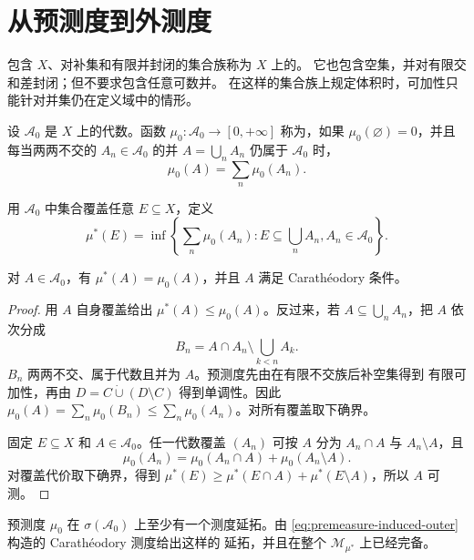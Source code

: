 \section{从预测度到外测度}

包含 $X$、对补集和有限并封闭的集合族称为 $X$ 上的。
它也包含空集，并对有限交和差封闭；但不要求包含任意可数并。
在这样的集合族上规定体积时，可加性只能针对并集仍在定义域中的情形。

\begin{definition}
设 $\mathcal A_0$ 是 $X$ 上的代数。函数
$\mu_0:\mathcal A_0\to[0,+\infty]$ 称为，如果
$\mu_0(\varnothing)=0$，并且每当两两不交的 $A_n\in\mathcal A_0$ 的并
$A=\bigcup_nA_n$ 仍属于 $\mathcal A_0$ 时，
\[
 \mu_0(A)=\sum_n\mu_0(A_n).
\]
\end{definition}

用 $\mathcal A_0$ 中集合覆盖任意 $E\subseteq X$，定义
\begin{equation}
 \mu^*(E)=\inf\left\{\sum_n\mu_0(A_n):
 E\subseteq\bigcup_nA_n, A_n\in\mathcal A_0\right\}.
 \label{eq:premeasure-induced-outer}
\end{equation}

\begin{lemma}
\label{lem:premeasure-agrees-on-algebra}
对 $A\in\mathcal A_0$，有 $\mu^*(A)=\mu_0(A)$，并且 $A$ 满足
Carathéodory 条件。
\end{lemma}

\begin{proof}
用 $A$ 自身覆盖给出 $\mu^*(A)\le\mu_0(A)$。反过来，若
$A\subseteq\bigcup_nA_n$，把 $A$ 依次分成
\[
 B_n=A\cap A_n\setminus\bigcup_{k<n}A_k.
\]
$B_n$ 两两不交、属于代数且并为 $A$。预测度先由在有限不交族后补空集得到
有限可加性，再由 $D=C\dot\cup(D\setminus C)$ 得到单调性。因此
$\mu_0(A)=\sum_n\mu_0(B_n)\le\sum_n\mu_0(A_n)$。对所有覆盖取下确界。

固定 $E\subseteq X$ 和 $A\in\mathcal A_0$。任一代数覆盖 $(A_n)$ 可按
$A$ 分为 $A_n\cap A$ 与 $A_n\setminus A$，且
\[
 \mu_0(A_n)=\mu_0(A_n\cap A)+\mu_0(A_n\setminus A).
\]
对覆盖代价取下确界，得到
$\mu^*(E)\ge\mu^*(E\cap A)+\mu^*(E\setminus A)$，所以 $A$ 可测。
\end{proof}

\begin{theorem}
\label{thm:caratheodory-extension}
预测度 $\mu_0$ 在 $\sigma(\mathcal A_0)$ 上至少有一个测度延拓。由
\eqref{eq:premeasure-induced-outer} 构造的 Carathéodory 测度给出这样的
延拓，并且在整个 $\mathcal M_{\mu^*}$ 上已经完备。
\end{theorem}

